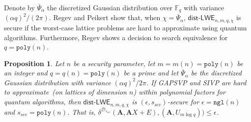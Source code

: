 \documentclass[11pt]{article}
\newcommand{\secref}[1]{\mbox{Section~\ref{#1}}}
\newcommand{\defref}[1]{\mbox{Definition~\ref{#1}}}
\newcommand{\class}[1]{{\ensuremath{\mathsf{#1}}}}
\newcommand{\vect}[1]{\ensuremath{\textbf{#1}}}
\newcommand{\Fq}{\ensuremath{\mathbb{F}_q}}
\newcommand{\unp}{\ensuremath{\mathtt{unp}}\xspace}
\newcommand{\poly}{\ensuremath{\mathtt{poly}}\xspace}
\newcommand{\ngl}{\ensuremath{\mathtt{ngl}}\xspace}
\newcommand{\lwe}{\class{LWE}}
\newcommand{\distLWE}{\ensuremath{\class{dist\mbox{-}LWE}}}
\newtheorem{proposition}[theorem]{Proposition}
\newcommand{\vA}{\vect{A}}
\newcommand{\vx}{\vect{x}}
\begin{document}
Denote by $\bar{\Psi}_\alpha$ the discretized Gaussian distribution over $\Fq$ with variance $(\alpha q)^2/(2\pi)$. Regev\cite{regev2005LWE} and Peikert \cite{peikert2009latticereduction} show that, when $\chi = \bar{\Psi}_{\alpha}$, $\class{dist}$-$\lwe_{n, m, q, \chi}$ is secure if the worst-case lattice problems are hard to approximate using quantum algorithms.
Furthermore, Regev \cite{regev2005LWE} shows a decision to search equivalence for $q=\poly(n)$.


\begin{proposition} 
\label{assume:entropy LWE}
Let $n$ be a security parameter, let $m = m(n) = \poly(n)$ be an integer and $q = q(n) = \poly(n)$ be a prime and let $\bar{\Psi}_\alpha$ be the discretized Gaussian distribution with variance $(\alpha q)^2/2\pi$.  If GAPSVP and SIVP are hard to approximate~(on lattices of dimension $n$) within polynomial factors for quantum algorithms, then $\distLWE_{n, m, q, \chi}$ is $(\epsilon, s_{sec})$-secure for $\epsilon = \ngl(n)$ and $s_{sec} = \poly(n)$.  That is, $\delta^{\mathcal{D}_{s_{sec}}}(\vA, \vA X+E ), (\vA, U_{m\log q}))\leq \epsilon$.

\end{proposition}
\end{document}
